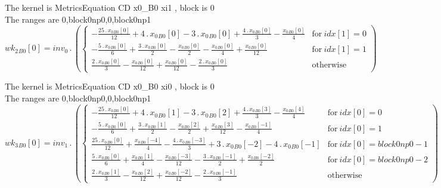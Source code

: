 \documentclass{article}
\begin{document}
\noindent The kernel is MetricsEquation CD x0_B0 xi1 , block is 0\\\noindent The ranges are 0,block0np0,0,block0np1\\\begin{dmath}{wk_{2}{_{B0}}}[{0}] = inv_0 \,.\, \left(\begin{cases} - \frac{25 \,.\, {x_{0}{_{B0}}}[{0}]}{12} + 4 \,.\, {x_{0}{_{B0}}}[{0}] - 3 \,.\, {x_{0}{_{B0}}}[{0}] + \frac{4 \,.\, {x_{0}{_{B0}}}[{0}]}{3} - \frac{{x_{0}{_{B0}}}[{0}]}{4} & 
\text{for}\: {idx}[{1}] = 0 \\- \frac{5 \,.\, {x_{0}{_{B0}}}[{0}]}{6} + \frac{3 \,.\, {x_{0}{_{B0}}}[{0}]}{2} - \frac{{x_{0}{_{B0}}}[{0}]}{2} - \frac{{x_{0}{_{B0}}}[{0}]}{4} + \frac{{x_{0}{_{B0}}}[{0}]}{12} & \text{for}\: {idx}[{1}] = 1 \\\frac{2 
\,.\, {x_{0}{_{B0}}}[{0}]}{3} - \frac{{x_{0}{_{B0}}}[{0}]}{12} + \frac{{x_{0}{_{B0}}}[{0}]}{12} - \frac{2 \,.\, {x_{0}{_{B0}}}[{0}]}{3} & \text{otherwise} \end{cases}\right)\end{dmath}

\noindent The kernel is MetricsEquation CD x0_B0 xi0 , block is 0\\\noindent The ranges are 0,block0np0,0,block0np1\\\begin{dmath}{wk_{3}{_{B0}}}[{0}] = inv_1 \,.\, \left(\begin{cases} - \frac{25 \,.\, {x_{0}{_{B0}}}[{0}]}{12} + 4 \,.\, {x_{0}{_{B0}}}[{1}] - 3 \,.\, {x_{0}{_{B0}}}[{2}] + \frac{4 \,.\, {x_{0}{_{B0}}}[{3}]}{3} - \frac{{x_{0}{_{B0}}}[{4}]}{4} & 
\text{for}\: {idx}[{0}] = 0 \\- \frac{5 \,.\, {x_{0}{_{B0}}}[{0}]}{6} + \frac{3 \,.\, {x_{0}{_{B0}}}[{1}]}{2} - \frac{{x_{0}{_{B0}}}[{2}]}{2} + \frac{{x_{0}{_{B0}}}[{3}]}{12} - \frac{{x_{0}{_{B0}}}[{-1}]}{4} & \text{for}\: {idx}[{0}] = 1 \\\frac{25 
\,.\, {x_{0}{_{B0}}}[{0}]}{12} + \frac{{x_{0}{_{B0}}}[{-4}]}{4} - \frac{4 \,.\, {x_{0}{_{B0}}}[{-3}]}{3} + 3 \,.\, {x_{0}{_{B0}}}[{-2}] - 4 \,.\, {x_{0}{_{B0}}}[{-1}] & \text{for}\: {idx}[{0}] = block0np0 - 1 \\\frac{5 \,.\, {x_{0}{_{B0}}}[{0}]}{6} + 
\frac{{x_{0}{_{B0}}}[{1}]}{4} - \frac{{x_{0}{_{B0}}}[{-3}]}{12} - \frac{3 \,.\, {x_{0}{_{B0}}}[{-1}]}{2} + \frac{{x_{0}{_{B0}}}[{-2}]}{2} & \text{for}\: {idx}[{0}] = block0np0 - 2 \\\frac{2 \,.\, {x_{0}{_{B0}}}[{1}]}{3} - 
\frac{{x_{0}{_{B0}}}[{2}]}{12} + \frac{{x_{0}{_{B0}}}[{-2}]}{12} - \frac{2 \,.\, {x_{0}{_{B0}}}[{-1}]}{3} & \text{otherwise} \end{cases}\right)\end{dmath}
\end{document}
